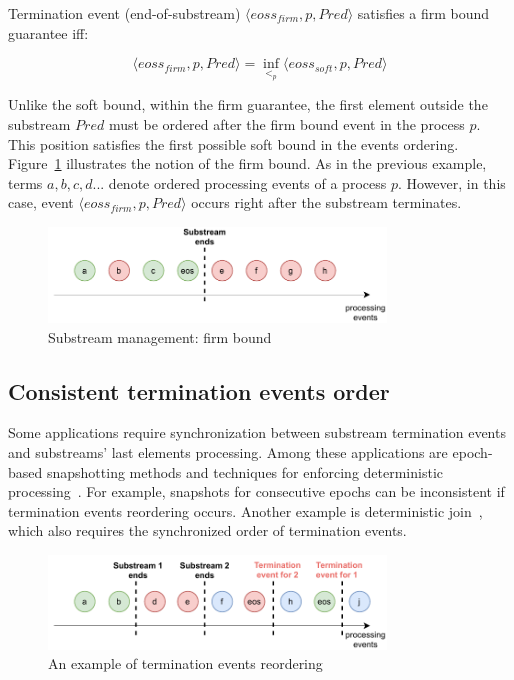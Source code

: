 \begin{definition}
Termination event (end-of-substream) $\langle eoss_{firm}, p, Pred\rangle$ satisfies a firm bound guarantee iff:

\begin{equation}
\langle eoss_{firm}, p, Pred\rangle = \inf_{<_p} \langle eoss_{soft}, p, Pred\rangle
\end{equation}
\end{definition}

Unlike the soft bound, within the firm guarantee, the first element outside the substream $Pred$ must be ordered after the firm bound event in the process $p$. This position satisfies the first possible soft bound in the events ordering. Figure~\ref{strict_guarantees} illustrates the notion of the firm bound. As in the previous example, terms $a,b,c,d...$ denote ordered processing events of a process $p$. However, in this case, event $\langle eoss_{firm}, p, Pred\rangle$ occurs right after the substream terminates.

\begin{figure}[t]
  \centering
  \includegraphics[width=0.80\textwidth]{Chapters/SubstreamConsistency/pics/strict-guarantee.pdf}
  \caption{Substream management: firm bound}
  \label{strict_guarantees}
\end{figure}

\subsection{Consistent termination events order}
Some applications require synchronization between substream termination events and substreams' last elements processing. Among these applications are epoch-based snapshotting methods and techniques for enforcing deterministic processing~\cite{we2018adbis}. For example, snapshots for consecutive epochs can be inconsistent if termination events reordering occurs. Another example is deterministic join~\cite{gulisano2016scalejoin}, which also requires the synchronized order of termination events.

\begin{figure}[t]
  \centering
  \includegraphics[width=0.80\textwidth]{Chapters/SubstreamConsistency/pics/notifications-reordering.pdf}
  \caption{An example of termination events reordering}
  \label{notifications_reordering}
\end{figure}

